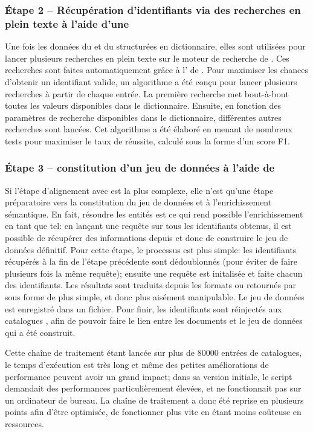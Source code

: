 \subsubsection{Étape 2 -- Récupération d'identifiants \wkd{} via des recherches en plein texte à l'aide d'une \api{}}
Une fois les données du \tname{} et du \ttrait{} structurées en dictionnaire, elles sont utilisées pour lancer plusieurs recherches en plein texte sur le moteur de recherche de \wkd{}. Ces recherches sont faites automatiquement grâce à l'\api{} de \wkd{}. Pour maximiser les chances d'obtenir un identifiant valide, un algorithme a été conçu pour lancer plusieurs recherches à partir de chaque entrée. La première recherche met bout-à-bout toutes les valeurs disponibles dans le dictionnaire. Ensuite, en fonction des paramètres de recherche disponibles dans le dictionnaire, différentes autres recherches sont lancées. Cet algorithme a été élaboré en menant de nombreux tests pour maximiser le taux de réussite, calculé sous la forme d'un \gls{score F1}.

\subsubsection{Étape 3 -- constitution d'un jeu de données à l'aide de \sparql{}}
Si l'étape d'alignement avec \wkd{} est la plus complexe, elle n'est qu'une étape préparatoire vers la constitution du jeu de données et à l'enrichissement sémantique. En fait, résoudre les entités est ce qui rend possible l'enrichissement en tant que tel: en lançant une requête \sparql{} sur tous les identifiants obtenus, il est possible de récupérer des informations depuis \wkd{} et donc de construire le jeu de données définitif. Pour cette étape, le processus est plus simple: les identifiants récupérés à la fin de l'étape précédente sont dédoublonnés (pour éviter de faire plusieurs fois la même requête); ensuite une requête \sparql{} est initalisée et faite chacun des identifiants. Les résultats sont traduits depuis les formats \json{} ou \xml{} retournés par \sparql{} sous forme de \json{} plus simple, et donc plus aisément manipulable. Le jeu de données est enregistré dans un fichier. Pour finir, les identifiants \wkd{} sont réinjectés aux catalogues \tei{}, afin de pouvoir faire le lien entre les documents et le jeu de données qui a été construit.

Cette chaîne de traitement étant lancée sur plus de 80000 entrées de catalogues, le temps d'exécution est très long et même des petites améliorations de performance peuvent avoir un grand impact; dans sa version initiale, le script demandait des performances particulièrement élevées, et ne fonctionnait pas sur un ordinateur de bureau. La chaîne de traitement a donc été reprise en plusieurs points afin d'être optimisée, de fonctionner plus vite en étant moins coûteuse en ressources.

